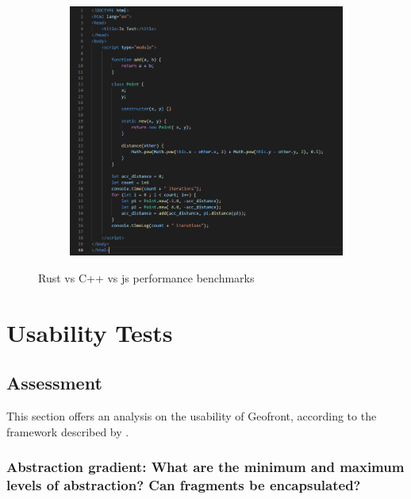 \begin{figure}
\begin{subfigure}[b]{0.32\linewidth}
    \centering
    \includegraphics[width=\linewidth]{js.PNG}
    \caption{}
  \end{subfigure}%
  \caption[benchmark]{Rust vs C++ vs js performance benchmarks}
  \label{fig:perf-benchmark}
\end{figure}


\section{Usability Tests}
\label{sec:testing:usability}




\subsection{Assessment}

This section offers an analysis on the usability of Geofront, according to the framework described by \cite[]{green_usability_1996}.

\subsubsection*{Abstraction gradient: What are the minimum and maximum levels of abstraction? Can fragments be encapsulated?}


